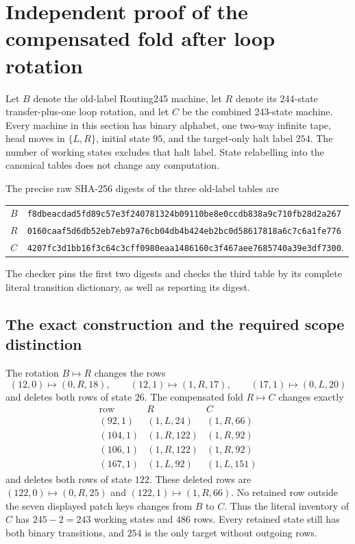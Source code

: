 \section{Independent proof of the compensated fold after loop rotation}
\label{sec:independent-composition-audit}

Let $B$ denote the old-label Routing245 machine, let $R$ denote its
244-state transfer-plus-one loop rotation, and let $C$ be the combined
243-state machine.  Every machine in this section has binary alphabet,
one two-way infinite tape, head moves in $\{L,R\}$, initial state $95$,
and the target-only halt label $254$.  The number of working states
excludes that halt label.  State relabelling into the canonical tables
does not change any computation.

The precise raw SHA-256 digests of the three old-label tables are
\begin{center}\scriptsize
\begin{tabular}{cl}
$B$ & \texttt{f8dbeacdad5fd89c57e3f240781324b09110be8e0ccdb838a9c710fb28d2a267}\\
$R$ & \texttt{0160caaf5d6db52eb7eb97a76cb04db4b424eb2bc0d58617818a6c7c6a1fe776}\\
$C$ & \texttt{4207fc3d1bb16f3c64c3cff0980eaa1486160c3f467aee7685740a39e3df7300}.
\end{tabular}
\end{center}
The checker pins the first two digests and checks the third table by its
complete literal transition dictionary, as well as reporting its digest.

\subsection{The exact construction and the required scope distinction}

The rotation $B\mapsto R$ changes the rows
\[
 (12,0)\mapsto(0,R,18),\qquad
 (12,1)\mapsto(1,R,17),\qquad
 (17,1)\mapsto(0,L,20)
\]
and deletes both rows of state $26$.
The compensated fold $R\mapsto C$ changes exactly
\[
\begin{array}{c|c|c}
\text{row}&R&C\\\hline
(92,1)&(1,L,24)&(1,R,66)\\
(104,1)&(1,R,122)&(1,R,92)\\
(106,1)&(1,R,122)&(1,R,92)\\
(167,1)&(1,L,92)&(1,L,151)
\end{array}
\]
and deletes both rows of state $122$.  These deleted rows are
$(122,0)\mapsto(0,R,25)$ and $(122,1)\mapsto(1,R,66)$.
No retained row outside the seven displayed patch keys changes from $B$
to $C$.  Thus the literal inventory of $C$ has $245-2=243$ working states
and $486$ rows.  Every retained state still has both binary transitions,
and $254$ is the only target without outgoing rows.

